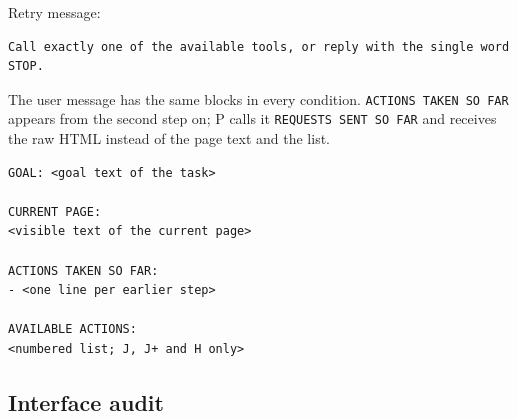Retry message:
\begin{Verbatim}
Call exactly one of the available tools, or reply with the single word STOP.
\end{Verbatim}
The user message has the same blocks in every condition.
\texttt{ACTIONS TAKEN SO FAR} appears from the second step on; P calls it \texttt{REQUESTS SENT SO FAR} and receives the raw HTML instead of the page text and the list.
\begin{Verbatim}
GOAL: <goal text of the task>

CURRENT PAGE:
<visible text of the current page>

ACTIONS TAKEN SO FAR:
- <one line per earlier step>

AVAILABLE ACTIONS:
<numbered list; J, J+ and H only>
\end{Verbatim}

\subsection{Interface audit}\label{app:prompts:audit}

